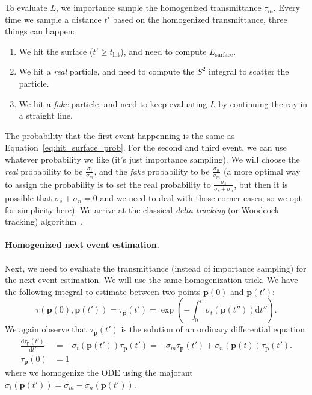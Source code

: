 To evaluate $L$, we importance sample the homogenized transmittance $\tau_m$. Every time we sample a distance $t'$ based on the homogenized transmittance, three things can happen:
\begin{enumerate}
    \item We hit the surface ($t' \geq t_{\text{hit}}$), and need to compute $L_{\text{surface}}$.
    \item We hit a \emph{real} particle, and need to compute the $S^2$ integral to scatter the particle.
    \item We hit a \emph{fake} particle, and need to keep evaluating $L$ by continuing the ray in a straight line.
\end{enumerate}

The probability that the first event happenning is the same as Equation~\ref{eq:hit_surface_prob}. For the second and third event, we can use whatever probability we like (it's just importance sampling). We will choose the \emph{real} probability to be $\frac{\sigma_t}{\sigma_m}$, and the \emph{fake} probability to be $\frac{\sigma_n}{\sigma_m}$ (a more optimal way to assign the probability is to set the real probability to $\frac{\sigma_s}{\sigma_s + \sigma_n}$, but then it is possible that $\sigma_s + \sigma_n = 0$ and we need to deal with those corner cases, so we opt for simplicity here). We arrive at the classical \emph{delta tracking} (or Woodcock tracking) algorithm~\cite{Woodcock:1965:TGC}.

\paragraph{Homogenized next event estimation.} Next, we need to evaluate the transmittance (instead of importance sampling) for the next event estimation.
We will use the same homogenization trick.
We have the following integral to estimate between two points $\mathbf{p}(0)$ and $\mathbf{p}(t')$:
\begin{equation}
\tau(\mathbf{p}(0), \mathbf{p}(t')) = \tau_\mathbf{p}(t') = \exp\left(-\int_{0}^{t'}\sigma_t(\mathbf{p}(t''))\mathrm{d}t''\right).
\end{equation}
We again observe that $\tau_\mathbf{p}(t')$ is the solution of an ordinary differential equation
\begin{equation}
\begin{aligned}
\frac{\mathrm{d}\tau_\mathbf{p}\left(t'\right)}{\mathrm{d}t'} &= -\sigma_t(\mathbf{p}(t'))\tau_\mathbf{p}\left(t'\right) = -\sigma_m \tau_\mathbf{p}\left(t'\right) + \sigma_n(\mathbf{p}(t))\tau_\mathbf{p}\left(t'\right). \\
\tau_\mathbf{p}(0) &= 1
\end{aligned}
\end{equation}
where we homogenize the ODE using the majorant $\sigma_t(\mathbf{p}(t')) = \sigma_m - \sigma_n(\mathbf{p}(t'))$.

